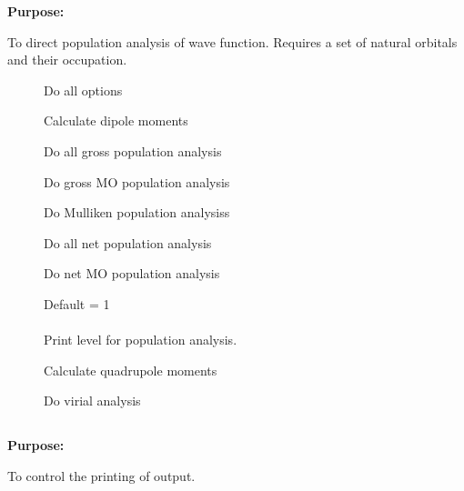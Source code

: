 {\bf Purpose:}
 
To direct population analysis of wave function.
Requires a set of natural orbitals and their occupation.
 
\begin{description}
\item[]
  Do all options
 
\item[]
  Calculate dipole moments
 
\item[]
  Do all gross population analysis
 
\item[]
  Do gross MO population analysis
 
\item[]
  Do Mulliken population analysiss
 
\item[]
  Do all net population analysis
 
\item[]
  Do net MO population analysis
 
\item[]
  Default = 1\\
   \\
  Print level for population analysis.

\item[]
  Calculate quadrupole moments

\item[]
  Do virial analysis
\end{description}
 
\pagebreak[3]
\subsection{\label{ref-priinp}}
 
{\bf Purpose:}
 
To control the printing of output.
 

